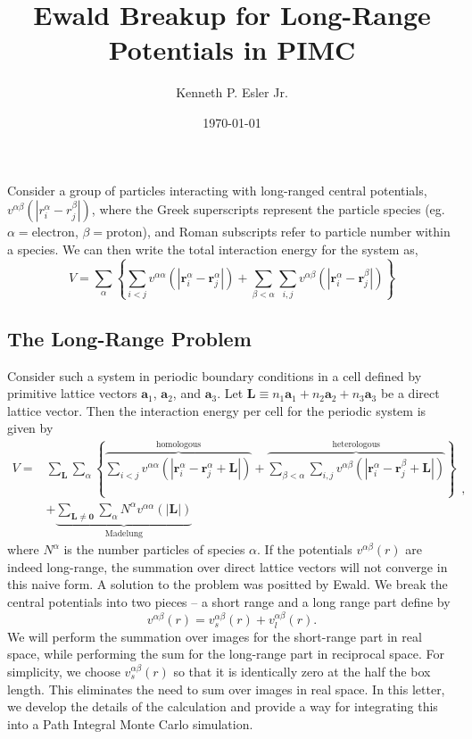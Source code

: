 \documentclass{article}
\title{Ewald Breakup for Long-Range Potentials in PIMC}
\author{Kenneth P. Esler Jr.}
\date{\today}
\begin{document}
\maketitle
Consider a group of particles interacting with long-ranged central
potentials, $v^{\alpha \beta}(|r^{\alpha}_i - r^{\beta}_j|)$, where the Greek superscripts
represent the particle species (eg. $\alpha=\text{electron}$,
$\beta=\text{proton}$), and Roman subscripts refer to particle number
within a species.  We can then write the total interaction energy for
the system as,
\newcommand{\vr}{\mathbf{r}}
\newcommand{\vR}{\mathbf{R}}
\newcommand{\vk}{\mathbf{k}}
\newcommand{\vq}{\mathbf{q}}
\begin{equation}
V = \sum_\alpha \left\{\sum_{i<j} v^{\alpha\alpha}(|\vr^\alpha_i - \vr^\alpha_j|) +
\sum_{\beta<\alpha} 
\sum_{i,j} v^{\alpha \beta}(|\vr^{\alpha}_i - \vr^{\beta}_j|) \right\}
\label{eq:Vperiodic}
\end{equation}
\newcommand{\va}{\mathbf{a}}
\newcommand{\vb}{\mathbf{b}}
\newcommand{\vL}{\mathbf{L}}
\subsection{The Long-Range Problem}
Consider such a system in periodic boundary conditions in a cell
defined by primitive lattice vectors $\va_1$, $\va_2$, and $\va_3$.
Let $\vL \equiv n_1 \va_1 + n_2 \va_2 + n_3\va_3$ be a direct lattice
vector.  Then the interaction energy per cell for the periodic system
is given by
\begin{equation}
\begin{split}
V = & \sum_\vL \sum_\alpha \left\{ 
\overbrace{\sum_{i<j} v^{\alpha\alpha}(|\vr^\alpha_i - \vr^\alpha_j + \vL|)}^{\text{homologous}} +
\overbrace{\sum_{\beta<\alpha} 
\sum_{i,j} v^{\alpha \beta}(|\vr^{\alpha}_i - \vr^{\beta}_j+\vL|)}^{\text{heterologous}}
\right\}  \\
& + \underbrace{\sum_{\vL \neq \mathbf{0}} \sum_\alpha N^\alpha v^{\alpha \alpha} (|\vL|)}_\text{Madelung}
\end{split}
\label{eq:direct},
\end{equation}
where $N^\alpha$ is the number particles of species $\alpha$.
If the potentials $v^{\alpha\beta}(r)$ are indeed long-range, the
summation over direct lattice vectors will not converge in this naive
form.  A solution to the problem was positted by Ewald.  We break the
central potentials into two pieces -- a short range and a long range
part define by
\begin{equation}
v^{\alpha \beta}(r) = v_s^{\alpha\beta}(r) + v_l^{\alpha \beta}(r).
\end{equation}
We will perform the summation over images for the short-range part in
real space, while performing the sum for the long-range part in
reciprocal space.  For simplicity, we choose $v^{\alpha \beta}_s(r)$
so that it is identically zero at the half the box length.  This
eliminates the need to sum over images in real space. In this letter,
we develop the details of the calculation and provide a way for
integrating this into a Path Integral Monte Carlo simulation.
\end{document}

